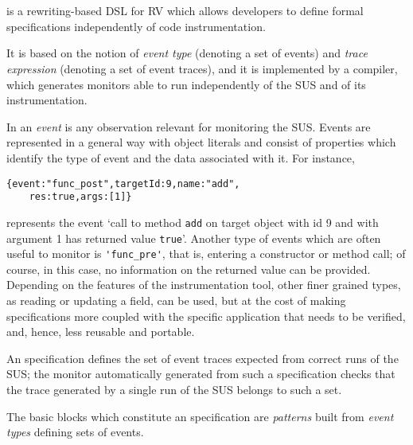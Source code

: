 \section{\rml}
\label{sec:rml}
\rml\cite{RML2021} is a rewriting-based DSL for RV which allows developers to define formal specifications independently of code instrumentation.

It  is based on the notion of \emph{event type} (denoting a set of events) and \emph{trace expression} (denoting a set of event traces),
and it is implemented by a compiler, which generates monitors able to run independently of the SUS and of its instrumentation. 

In \rml an \emph{event} is any observation relevant for monitoring the SUS.
Events are represented in a general way with object literals and
consist of properties which identify the type of event and the data associated with it. For instance,

\begin{lstlisting}
{event:"func_post",targetId:9,name:"add",
    res:true,args:[1]}
\end{lstlisting}          
represents the event
`call to method \lstinline{add} on target object with id 9 and with argument 1  has returned value \lstinline{true}'.
Another type of events which are often useful to monitor is \lstinline{'func_pre'}, that is, entering a constructor or method call; of course, in this
case, no information on the returned value can be provided. Depending on the features of the instrumentation tool, other finer grained types,
as reading or updating a field, can be used, but at the cost of making specifications more coupled with the specific application that needs to be
verified, and, hence, less reusable and portable.

An \rml specification defines the set of event traces expected from correct runs of the SUS; the monitor automatically generated from
such a specification checks that the trace generated by a single run of the SUS belongs to such a set.

The basic blocks which constitute an \rml specification are \emph{patterns} built from
\emph{event types} defining sets of events.

